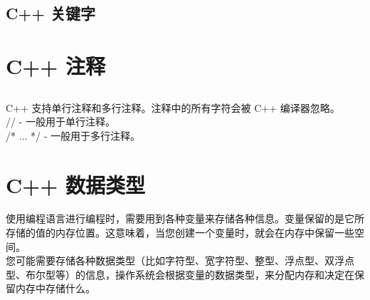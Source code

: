 \documentclass[12pt,twiside,a4paper]{ctexbook}
\numberwithin{chapter}{part}
\begin{document}
\section{C++ 关键字}

\chapter{C++ 注释}
\section{}
C++ 支持单行注释和多行注释。注释中的所有字符会被 C++ 编译器忽略。\\
// - 一般用于单行注释。\\
/* ... */ - 一般用于多行注释。

\chapter{C++ 数据类型}
使用编程语言进行编程时，需要用到各种变量来存储各种信息。变量保留的是它所存储的值的内存位置。这意味着，当您创建一个变量时，就会在内存中保留一些空间。\\
您可能需要存储各种数据类型（比如字符型、宽字符型、整型、浮点型、双浮点型、布尔型等）的信息，操作系统会根据变量的数据类型，来分配内存和决定在保留内存中存储什么。
\end{document}
